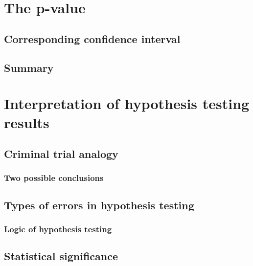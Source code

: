 \documentclass[12pt, krantz2,]{krantz}
\begin{document}
\hypertarget{p-value}{%
\section{The p-value}\label{p-value}}

\hypertarget{corresponding-confidence-interval}{%
\subsection{Corresponding confidence interval}\label{corresponding-confidence-interval}}

\hypertarget{summary-5}{%
\subsection{Summary}\label{summary-5}}

\hypertarget{ht-interpretation}{%
\section{Interpretation of hypothesis testing results}\label{ht-interpretation}}

\hypertarget{trial}{%
\subsection{Criminal trial analogy}\label{trial}}

\hypertarget{two-possible-conclusions}{%
\subsubsection*{Two possible conclusions}\label{two-possible-conclusions}}


\hypertarget{types-of-errors-in-hypothesis-testing}{%
\subsection{Types of errors in hypothesis testing}\label{types-of-errors-in-hypothesis-testing}}

\hypertarget{logic-of-hypothesis-testing}{%
\subsubsection*{Logic of hypothesis testing}\label{logic-of-hypothesis-testing}}


\hypertarget{statistical-significance}{%
\subsection{Statistical significance}\label{statistical-significance}}
\end{document}
